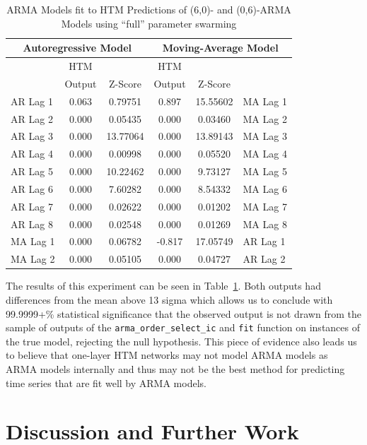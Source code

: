 \documentclass[oneside,12pt,openany]{book}
\begin{document}
	\begin{table}[hbt!]
		\centering
		\begin{tabular}{|l|c|c|c|c|l|}
			\hline
			\multicolumn{3}{|c|}{Autoregressive Model} & \multicolumn{3}{c|}{Moving-Average Model} \\ \hline
			\cellcolor{black} & HTM & & HTM &  & \cellcolor{black} \\
			\cellcolor{black} & Output & Z-Score & Output & Z-Score & \cellcolor{black} \\ \hline
			AR Lag 1 & 0.063 & 0.79751 & 0.897 & 15.55602 & MA Lag 1 \\ \hline
			AR Lag 2 & 0.000 & 0.05435 & 0.000 & 0.03460 & MA Lag 2 \\ \hline
			AR Lag 3 & 0.000 & 13.77064 & 0.000 & 13.89143 & MA Lag 3 \\ \hline
			AR Lag 4 & 0.000 & 0.00998 & 0.000 & 0.05520 & MA Lag 4 \\ \hline
			AR Lag 5 & 0.000 & 10.22462 & 0.000 & 9.73127 & MA Lag 5 \\ \hline
			AR Lag 6 & 0.000 & 7.60282 & 0.000 & 8.54332 & MA Lag 6 \\ \hline
			AR Lag 7 & 0.000 & 0.02622 & 0.000 & 0.01202 & MA Lag 7 \\ \hline
			AR Lag 8 & 0.000 & 0.02548 & 0.000 & 0.01269 & MA Lag 8 \\ \hline
			MA Lag 1 & 0.000 & 0.06782 & -0.817 & 17.05749 & AR Lag 1 \\ \hline
			MA Lag 2 & 0.000 & 0.05105 & 0.000 & 0.04727 & AR Lag 2 \\ \hline
		\end{tabular}
		\caption{ARMA Models fit to HTM Predictions of (6,0)- and (0,6)-ARMA Models using ``full'' parameter swarming}
		\label{tab:HTMARMAError6Full}
	\end{table}
	
	The results of this experiment can be seen in Table~\ref{tab:HTMARMAError6Full}. Both outputs had differences from the mean above 13 sigma which allows us to conclude with 99.9999+\% statistical significance that the observed output is not drawn from the sample of outputs of the \texttt{arma\_order\_select\_ic} and \texttt{fit} function on instances of the true model, rejecting the null hypothesis. This piece of evidence also leads us to believe that one-layer HTM networks may not model ARMA models as ARMA models internally and thus may not be the best method for predicting time series that are fit well by ARMA models.
	
	
	\chapter{Discussion and Further Work}
    
\end{document}
